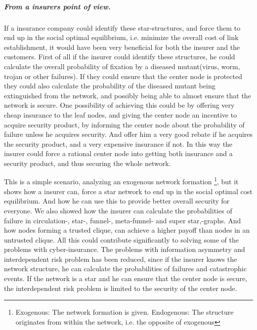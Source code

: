 \subparagraph{From a insurers point of view.}
If a insurance company could identify these star-structures, and force them to end up in the social optimal equilibrium, i.e. minimize the overall cost of link establishment, it would have been very beneficial for both the insurer and the customers.
First of all if the insurer could identify these structures, he could calculate the overall probability of fixation by a diseased mutant(virus, worm, trojan or other failures). If they could ensure that the center node is protected they could also calculate the probability of the diseased mutant being extinguished from the network, and possibly being able to almost ensure that the network is secure. 
One possibility of achieving this could be by offering very cheap insurance to the leaf nodes, and giving the center node an incentive to acquire security product, by informing the center node about the probability of failure unless he acquires security. And offer him a very good rebate if he acquires the security product, and a very expensive insurance if not. In this way the insurer could force a rational center node into getting both insurance and a security product, and thus securing the whole network.

This is a simple scenario, analyzing an exogenous network formation \footnote{Exogenous: The network formation is given. Endogenous: The structure originates from within the network, i.e. the opposite of exogenous}, 
but it shows how a insurer can, force a star network to end up in the social optimal cost equilibrium. And how he can use this to provide better overall security for everyone. We also showed how the insurer can calculate the probabilities of failure in circulation-, star-, funnel-, meta-funnel- and super star,-graphs.   And how nodes forming a trusted clique, can achieve a higher payoff than nodes in an untrusted clique. 
All this could contribute significantly to solving some of the problems with cyber-insurance. The problems with information asymmetry and interdependent risk problem has been reduced, since if the insurer knows the network structure, he can calculate the probabilities of failures and catastrophic events. If the network is a star and he can ensure that the center node is secure, the interdependent risk problem is limited to the security of the center node. 

